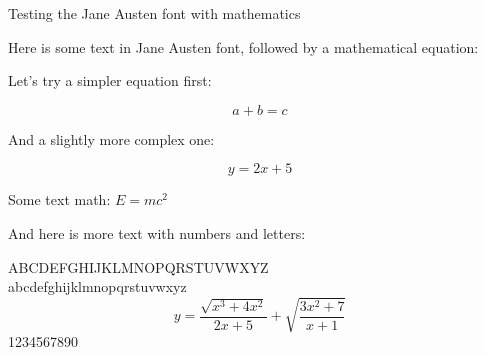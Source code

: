 \documentclass{article}
\begin{document}
\large Testing the Jane Austen font with mathematics

Here is some text in Jane Austen font, followed by a mathematical equation:

Let's try a simpler equation first:

\[ a + b = c \]

And a slightly more complex one:

\[ y = 2x + 5 \]

Some text math: $E = mc^2$

And here is more text with numbers and letters:

ABCDEFGHIJKLMNOPQRSTUVWXYZ\\
abcdefghijklmnopqrstuvwxyz\\
\[ 
y = \frac{\sqrt{x^3 + 4x^2}}{2x + 5} + \sqrt{\frac{3x^2 + 7}{x + 1}}
\]
1234567890 
\end{document}
